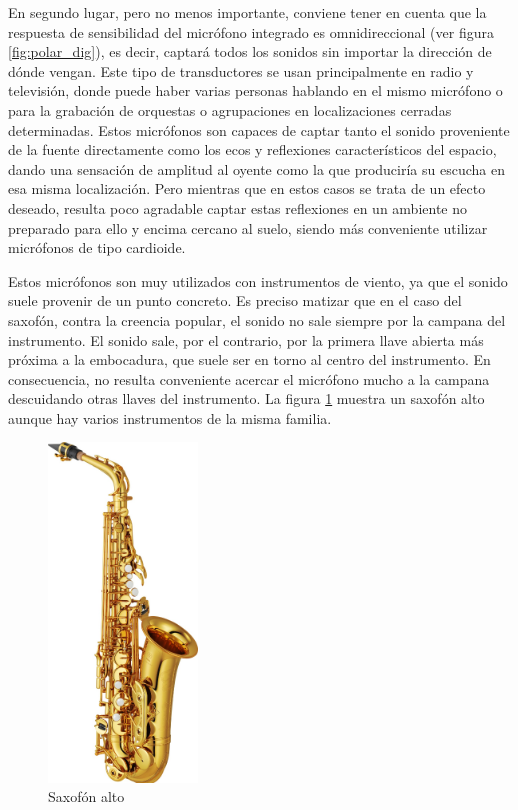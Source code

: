 En segundo lugar, pero no menos importante, conviene tener en cuenta que la respuesta de sensibilidad del micrófono integrado es omnidireccional (ver figura \ref{fig:polar_dig}), es decir, captará todos los sonidos sin importar la dirección de dónde vengan. Este tipo de transductores se usan principalmente en radio y televisión, donde puede haber varias personas hablando en el mismo micrófono o para la grabación de orquestas o agrupaciones en localizaciones cerradas determinadas. Estos micrófonos son capaces de captar tanto el sonido proveniente de la fuente directamente como los ecos y reflexiones característicos del espacio, dando una sensación de amplitud al oyente como la que produciría su escucha en esa misma localización. Pero mientras que en estos casos se trata de un efecto deseado, resulta poco agradable captar estas reflexiones en un ambiente no preparado para ello y encima cercano al suelo, siendo más conveniente utilizar micrófonos de tipo cardioide.

Estos micrófonos son muy utilizados con instrumentos de viento, ya que el sonido suele provenir de un punto concreto. Es preciso matizar que en el caso del saxofón, contra la creencia popular, el sonido no sale siempre por la campana del instrumento. El sonido sale, por el contrario, por la primera llave abierta más próxima a la embocadura, que suele ser en torno al centro del instrumento. En consecuencia, no resulta conveniente acercar el micrófono mucho a la campana descuidando otras llaves del instrumento. La figura \ref{fig:saxo} muestra un saxofón alto aunque hay varios instrumentos de la misma familia.

\begin{figure}[!b]
\begin{center}
\includegraphics[height=9cm]{img/saxo.png}
\caption{\label{fig:saxo}Saxofón alto}
\end{center}
\end{figure}

